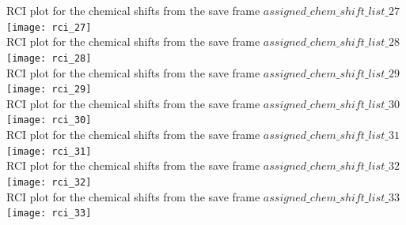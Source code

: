 RCI plot for the chemical shifts from the  save frame $assigned\_chem\_shift\_list\_27$\\ \texttt{[image: rci\_27]}\\
RCI plot for the chemical shifts from the  save frame $assigned\_chem\_shift\_list\_28$\\ \texttt{[image: rci\_28]}\\
RCI plot for the chemical shifts from the  save frame $assigned\_chem\_shift\_list\_29$\\ \texttt{[image: rci\_29]}\\
RCI plot for the chemical shifts from the  save frame $assigned\_chem\_shift\_list\_30$\\ \texttt{[image: rci\_30]}\\
RCI plot for the chemical shifts from the  save frame $assigned\_chem\_shift\_list\_31$\\ \texttt{[image: rci\_31]}\\
RCI plot for the chemical shifts from the  save frame $assigned\_chem\_shift\_list\_32$\\ \texttt{[image: rci\_32]}\\
RCI plot for the chemical shifts from the  save frame $assigned\_chem\_shift\_list\_33$\\ \texttt{[image: rci\_33]}\\

